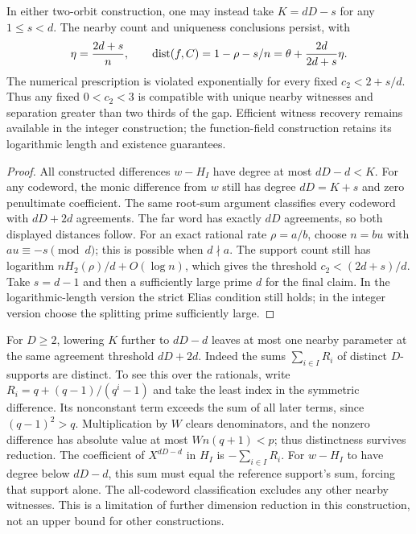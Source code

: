 \begin{corollary}
\label{tou:degree-tradeoff}
In either two-orbit construction, one may instead take
$K=dD-s$ for any $1\le s<d$. The nearby count and uniqueness
conclusions persist, with
\[
 \eta=\frac{2d+s}{n},\qquad
 \operatorname{dist}(f,C)=1-\rho-s/n
          =\theta+\frac{2d}{2d+s}\eta.
\]
The numerical prescription is violated exponentially for every
fixed $c_2<2+s/d$. Thus any fixed $0<c_2<3$ is compatible with
unique nearby witnesses and separation greater than two thirds of
the gap. Efficient witness recovery remains available in the
integer construction; the function-field construction retains its
logarithmic length and existence guarantees.
\end{corollary}
\begin{proof}
All constructed differences $w-H_I$ have degree at most $dD-d<K$.
For any codeword, the monic difference from $w$ still has degree
$dD=K+s$ and zero penultimate coefficient. The same root-sum
argument classifies every codeword with $dD+2d$ agreements.
The far word has exactly $dD$ agreements, so both displayed distances
follow. For an exact rational rate $\rho=a/b$, choose $n=bu$ with
$au\equiv-s\pmod d$; this is possible when $d\nmid a$.
The support count still has logarithm $nH_2(\rho)/d+O(\log n)$,
which gives the threshold $c_2<(2d+s)/d$.
Take $s=d-1$ and then a sufficiently large prime $d$ for the final
claim. In the logarithmic-length version the strict Elias condition
still holds; in the integer version choose the splitting prime
sufficiently large.
\end{proof}

\begin{remark}
For $D\ge2$, lowering $K$ further to $dD-d$ leaves at most one nearby
parameter at the same agreement threshold $dD+2d$.
Indeed the sums $\sum_{i\in I}R_i$ of distinct $D$-supports are
distinct. To see this over the rationals, write
$R_i=q+(q-1)/(q^i-1)$ and take the least index in the symmetric
difference. Its nonconstant term exceeds the sum of all later terms,
since $(q-1)^2>q$. Multiplication by $W$ clears denominators, and
the nonzero difference has absolute value at most $Wn(q+1)<p$;
thus distinctness survives reduction.
The coefficient of $X^{dD-d}$ in $H_I$ is $-\sum_{i\in I}R_i$.
For $w-H_I$ to have degree below $dD-d$, this sum must equal the
reference support's sum, forcing that support alone.
The all-codeword classification excludes any other nearby witnesses.
This is a limitation of further dimension reduction in this construction,
not an upper bound for other constructions.
\end{remark}
